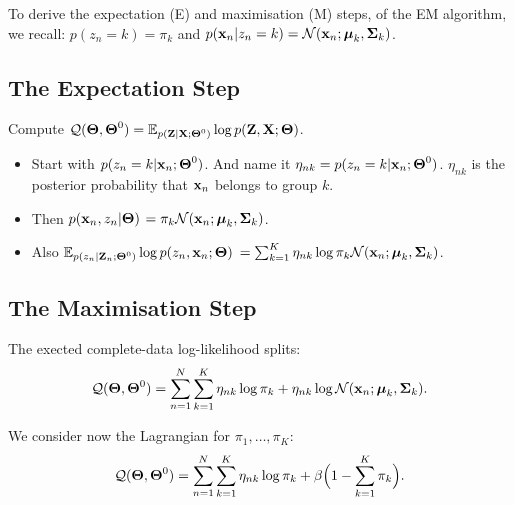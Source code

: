 To derive the expectation (E) and maximisation (M) steps, of the EM algorithm, we recall: $p(z_n=k)=\pi_k$ and $p(\boldsymbol{\mathbf{x}}_n|z_n=k) = \mathcal{N}(\boldsymbol{\mathbf{x}}_n;\boldsymbol{\mathbf{\mu}}_k,\boldsymbol{\mathbf{\Sigma}}_k)$.

\subsection{The Expectation Step} Compute $\mathcal{Q}(\boldsymbol{\mathbf{\Theta}},\boldsymbol{\mathbf{\Theta}}^0) = \mathbb{E}_{p(\boldsymbol{\mathbf{Z}}|\boldsymbol{\mathbf{X}};\boldsymbol{\mathbf{\Theta}}^0)} \log p(\boldsymbol{\mathbf{Z}},\boldsymbol{\mathbf{X}};\boldsymbol{\mathbf{\Theta}})$.
 \begin{itemize}
  \item Start with $p(z_n=k|\boldsymbol{\mathbf{x}}_n;\boldsymbol{\mathbf{\Theta}}^0)$. And name it $\eta_{nk}=p(z_n=k|\boldsymbol{\mathbf{x}}_n;\boldsymbol{\mathbf{\Theta}}^0)$. $\eta_{nk}$ is the posterior probability that $\boldsymbol{\mathbf{x}}_n$ belongs to group $k$.
  \item Then $p(\boldsymbol{\mathbf{x}}_n,z_n|\boldsymbol{\mathbf{\Theta}})$ $ =\pi_k\mathcal{N}(\boldsymbol{\mathbf{x}}_n;\boldsymbol{\mathbf{\mu}}_k,\boldsymbol{\mathbf{\Sigma}}_k)$.
  \item Also $\mathbb{E}_{p(z_n|\boldsymbol{\mathbf{Z}}_n;\boldsymbol{\mathbf{\Theta}}^0)} \log p(z_n,\boldsymbol{\mathbf{x}}_n;\boldsymbol{\mathbf{\Theta}})$ $ =\sum_{k=1}^K \eta_{nk} \log \pi_k\mathcal{N}(\boldsymbol{\mathbf{x}}_n;\boldsymbol{\mathbf{\mu}}_k,\boldsymbol{\mathbf{\Sigma}}_k)$.
 \end{itemize}

 
\subsection{The Maximisation Step}  The exected complete-data log-likelihood splits:
  \begin{equation}\mathcal{Q}(\boldsymbol{\mathbf{\Theta}},\boldsymbol{\mathbf{\Theta}}^0) = \sum_{n=1}^N\sum_{k=1}^K \eta_{nk} \log \pi_k + \eta_{nk}\log\mathcal{N}(\boldsymbol{\mathbf{x}}_n;\boldsymbol{\mathbf{\mu}}_k,\boldsymbol{\mathbf{\Sigma}}_k).\end{equation}
  
  We consider now the Lagrangian for $\pi_1,\ldots,\pi_K$:
  \begin{equation}\mathcal{Q}(\boldsymbol{\mathbf{\Theta}},\boldsymbol{\mathbf{\Theta}}^0) = \sum_{n=1}^N\sum_{k=1}^K \eta_{nk} \log \pi_k + \beta\Big(1-\sum_{k=1}^K \pi_k\Big).\end{equation}
  
